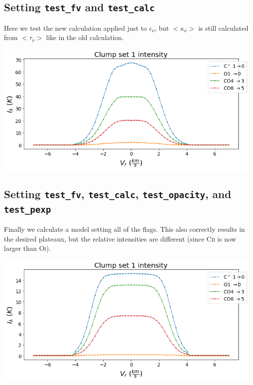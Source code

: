 \documentclass[a4paper]{article}
\begin{document}
    \subsection{Setting \texttt{test\_fv} and \texttt{test\_calc}}

    Here we test the new calculation applied just to \(\epsilon_\nu\), but \(<\kappa_\nu>\) is still calculated from \(<\tau_\nu>\) like in the old calculation.

    \includegraphics*[width=\linewidth]{voxel_error_fv-calc-opacity.png}

    \subsection{Setting \texttt{test\_fv}, \texttt{test\_calc}, \texttt{test\_opacity}, and \texttt{test\_pexp}}

    Finally we calculate a model setting all of the flags.
    This also correctly results in the desired plateaux, but the relative intensities are different (since C\textsc{ii} is now larger than O\textsc{i}).

    \includegraphics*[width=\linewidth]{voxel_error_fv-calc-opacity-pexp.png}
\end{document}

